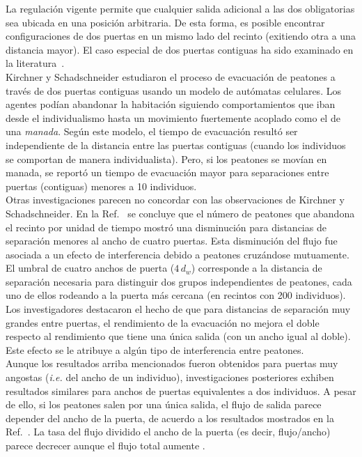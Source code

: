 \noindent La regulación vigente permite que cualquier salida adicional a las dos obligatorias sea ubicada en una posición arbitraria. De esta forma, es posible encontrar configuraciones de dos puertas en un mismo lado del recinto (exitiendo otra a una distancia mayor). El caso especial de dos puertas contiguas ha sido examinado en la literatura~\cite{kirchner1,perez1,daoliang1,huanhuan1}. \\

\noindent Kirchner y Schadschneider estudiaron el proceso de evacuación de peatones a través de dos puertas contiguas usando un modelo de autómatas celulares\cite{kirchner1}. Los agentes podían abandonar la habitación siguiendo comportamientos que iban desde el individualismo hasta un movimiento fuertemente acoplado como el de una \emph{manada}. Según este modelo, el tiempo de evacuación resultó ser independiente de la distancia entre las puertas contiguas (cuando los individuos se comportan de manera individualista). Pero, si los peatones se movían en manada, se reportó un tiempo de evacuación mayor   para separaciones entre puertas (contiguas) menores a 10 individuos.\\

\noindent Otras investigaciones parecen no concordar con las observaciones de Kirchner y Schadschneider. En la Ref.~\cite{perez1} se concluye que el número de peatones que abandona el recinto por unidad de tiempo mostró una disminución para distancias de separación menores al ancho de cuatro puertas. Esta disminución del flujo fue asociada a un efecto de interferencia debido a peatones cruzándose mutuamente. El umbral de cuatro anchos de puerta ($4\,d_w$) corresponde a la distancia de separación necesaria para distinguir dos  grupos independientes de peatones, cada uno de ellos rodeando a la puerta más cercana (en recintos con 200 individuos). \\

\noindent Los investigadores destacaron el hecho de que para distancias de separación muy grandes entre puertas, el rendimiento de la evacuación no mejora el doble respecto al rendimiento que tiene una única salida (con un ancho igual al doble). Este efecto se le atribuye a algún tipo de interferencia entre peatones\cite{perez1}.\\

\noindent Aunque los resultados arriba mencionados fueron obtenidos para puertas muy angostas (\emph{i.e.} del ancho de un individuo),
investigaciones posteriores exhiben resultados similares para anchos de puertas equivalentes a dos individuos. A pesar de ello, si los peatones salen por una única salida, el flujo de salida parece depender del ancho de la puerta, de acuerdo a los resultados mostrados en la Ref.~\cite{daoliang1}. La tasa del flujo dividido el ancho de la puerta (es decir, flujo/ancho) parece decrecer aunque el flujo total aumente \cite{daoliang1}.\\
 
